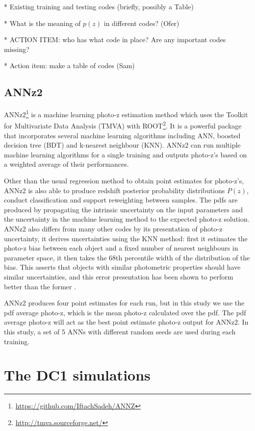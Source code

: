 \documentclass[usenatbib]{mn2e}
\begin{document}
* Existing training and testing codes (briefly, possibly a Table)

* What is the meaning of $p(z)$ in different codes? (Ofer) 

* ACTION ITEM: who has what code in place? Are any important codes missing?

* Action item: make a table of codes (Sam)

\subsection{ANNz2}\label{sec:annz2}
ANNz2\footnote{\url{https://github.com/IftachSadeh/ANNZ}} \citep{sadeh_annz2:_2016} is a machine learning photo-z estimation method which uses the Toolkit for Multivariate Data Analysis (TMVA) with ROOT\footnote{\url{http://tmva.sourceforge.net/}}. It is a powerful package that incorporates several machine learning algorithms including ANN, boosted decision tree (BDT) and k-nearest neighbour (KNN). ANNz2 can run multiple machine learning algorithms for a single training and outputs photo-z's based on a weighted average of their performances.

Other than the usual regression method to obtain point estimates for photo-z's, ANNz2 is also able to produce redshift posterior probability distributions $P(z)$, conduct classification and support reweighting between samples. The pdfs are produced by propagating the intrinsic uncertainty on the input parameters and the uncertainty in the machine learning method to the expected photo-z solution. ANNz2 also differs from many other codes by its presentation of photo-z uncertainty, it derives uncertainties using the KNN method: first it estimates the photo-z bias between each object and a fixed number of nearest neighbours in parameter space, it then takes the 68th percentile width of the distribution of the bias. This asserts that objects with similar photometric properties should have similar uncertainties, and this error presentation has been shown to perform better than the former \citep{sadeh_annz2:_2016}.

ANNz2 produces four point estimates for each run, but in this study we use the pdf average photo-z, which is the mean photo-z calculated over the pdf. The pdf average photo-z will act as the best point estimate photo-z output for ANNz2. In this study, a set of 5 ANNs with different random seeds are used during each training. 

\section{The DC1 simulations}\label{sims}
\end{document}
